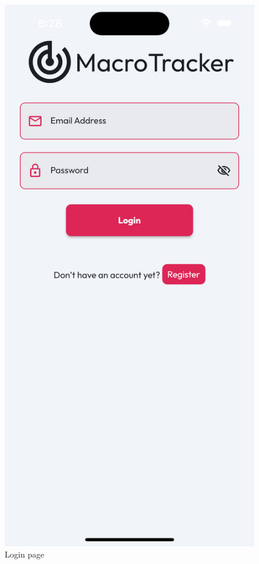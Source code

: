 \documentclass{Configuration_Files/PoliMi3i_thesis}
\begin{document}
\begin{figure}[!ht]
  \includegraphics[scale=0.1]{Images/Screenshots/Mobile/LoginLight.png}
  \caption{Login page}
\end{figure}
\end{document}
